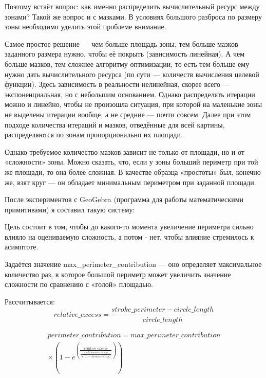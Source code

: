 Поэтому встаёт вопрос: как именно распределить вычислительный ресурс между зонами?
Такой же вопрос и с мазками.
В условиях большого разброса по размеру зоны необходимо уделить этой проблеме внимание.

Самое простое решение — чем больше площадь зоны, тем больше мазков заданного размера нужно,
чтобы её покрыть (зависимость линейная).
А чем больше мазков, тем сложнее алгоритму оптимизации, то есть тем больше ему нужно дать вычислительного ресурса
(по сути — количеств вычисления целевой функции).
Здесь зависимость в реальности нелинейная, скорее всего — экспоненциальная, но с небольшим основанием.
Однако распределять итерации можно и линейно, чтобы не произошла ситуация, при которой на маленькие зоны не выделены итерации вообще,
а не средние — почти совсем.
Далее при этом подходе количества итераций и мазков, отведённые для всей картины, распределяются по зонам пропорционально их площади.

Однако требуемое количество мазков зависит не только от площади, но и от «сложности» зоны.
Можно сказать, что, если у зоны больший периметр при той же площади, то она более сложная.
В качестве образца «простоты» был, конечно же, взят круг — он обладает минимальным периметром при заданной площади.

После экспериментов с GeoGebra (программа для работы математическими примитивами) я составил такую систему:

Цель состоит в том, чтобы до какого-то момента увеличение периметра сильно влияло на оцениваемую сложность, а потом - нет, чтобы влияние стремилось к асимптоте.

Задаётся значение max\_perimeter\_contribution — оно определяет
максимальное количество раз, в которое большой периметр может увеличить значение сложности по сравнению с «голой» площадью.

Рассчитывается:
\begin{equation}
    relative\_excess = \frac{stroke\_perimeter - circle\_length}{circle\_length}
\end{equation}

\begin{equation}
    \begin{gathered}
        perimeter\_contribution = max\_perimeter\_contribution \\
        \times \left(1 - e^\left(\frac{relative\_excess}{\frac{x\_of\_characteristic\_y}{\ln(1 - characteristic\_y)}} \right)\right)
    \end{gathered}
\end{equation}

